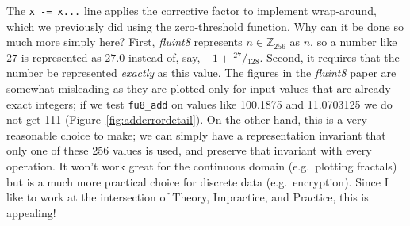 \documentclass[twocolumn]{article}
\newcommand\sfrac[2]{\!{}\,^{#1}\!/{}\!_{#2}}
\begin{document}
The \verb|x -= x...| line applies the corrective factor to implement
wrap-around, which we previously did using the zero-threshold function.
Why can it be done so much more simply here? First, {\it fluint8}
represents $n \in \mathbb{Z}_{256}$ as $n$, so a number like $27$ is
represented as $27.0$ instead of, say, $-1 + \sfrac{27}{128}$.
Second, it
requires that the number be represented {\em exactly} as this value.
The figures in the {\it fluint8} paper are somewhat misleading as they are plotted
only for input values that are already exact integers; if we test
\verb+fu8_add+ on values like 100.1875 and 11.0703125 we do not get
111 (Figure~\ref{fig:adderrordetail}). On the other hand, this is a
very reasonable choice to make; we can simply have a representation
invariant that only one of these 256 values is used, and preserve that
invariant with every operation. It won't work great for the continuous
domain (e.g.~plotting fractals) but is a much more practical choice for
discrete data (e.g.~encryption).
Since I like to work at the intersection of Theory, Impractice, and Practice,
this is appealing!
\end{document}

